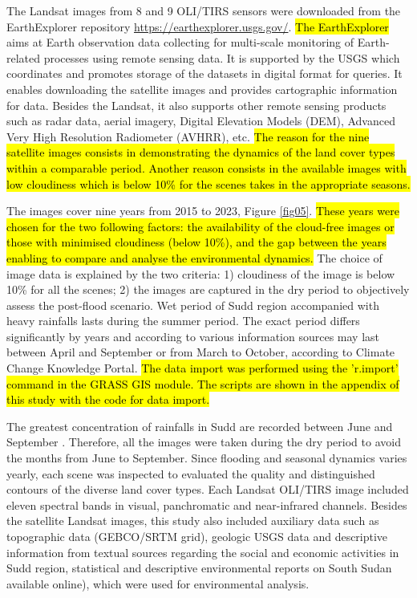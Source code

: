\documentclass[analytics,article,submit,pdftex,moreauthors]{Definitions/mdpi}
\begin{document}
The Landsat images from 8 and 9 OLI/TIRS sensors were downloaded from the EarthExplorer repository \href{https://earthexplorer.usgs.gov/}{https://earthexplorer.usgs.gov/}. \hl{The EarthExplorer} aims at Earth observation data collecting for multi-scale monitoring of Earth-related processes using remote sensing data. It is supported by the USGS which coordinates and promotes storage of the datasets in digital format for queries. It enables downloading the satellite images and provides cartographic information for data. Besides the Landsat, it also supports other remote sensing products such as radar data, aerial imagery, Digital Elevation Models (DEM), Advanced Very High Resolution Radiometer (AVHRR), etc. \hl{The reason for the nine satellite images consists in demonstrating the dynamics of the land cover types within a comparable period. Another reason consists in the available images with low cloudiness which is below 10\% for the scenes takes in the appropriate seasons.}

The images cover nine years from 2015 to 2023, Figure \ref{fig05}. \hl{These years were chosen for the two following factors: the availability of the cloud-free images or those with minimised cloudiness (below 10\%), and the gap between the years enabling to compare and analyse the environmental dynamics.} The choice of image data is explained by the two criteria: 1) cloudiness of the image is below 10\% for all the scenes; 2) the images are captured in the dry period to objectively assess the post-flood scenario. Wet period of Sudd region accompanied with heavy rainfalls lasts during the summer period. The exact period differs significantly by years and according to various information sources may last between April and September \cite{MartinBurgess} or from March to October, according to Climate Change Knowledge Portal. \hl{The data import was performed using the 'r.import' command in the GRASS GIS module. The scripts are shown in the appendix of this study with the code for data import.}

The greatest concentration of rainfalls in Sudd are recorded between June and September \cite{Climatic}. Therefore, all the images were taken during the dry period to avoid the months from June to September. Since flooding and seasonal dynamics varies yearly, each scene was inspected to evaluated the quality and distinguished contours of the diverse land cover types. Each Landsat OLI/TIRS image included eleven spectral bands in visual, panchromatic and near-infrared channels. Besides the satellite Landsat images, this study also included auxiliary data such as topographic data (GEBCO/SRTM grid), geologic USGS data and descriptive information from textual sources regarding the social and economic activities in Sudd region, statistical and descriptive environmental reports on South Sudan available online), which were used for environmental analysis.
\end{document}
